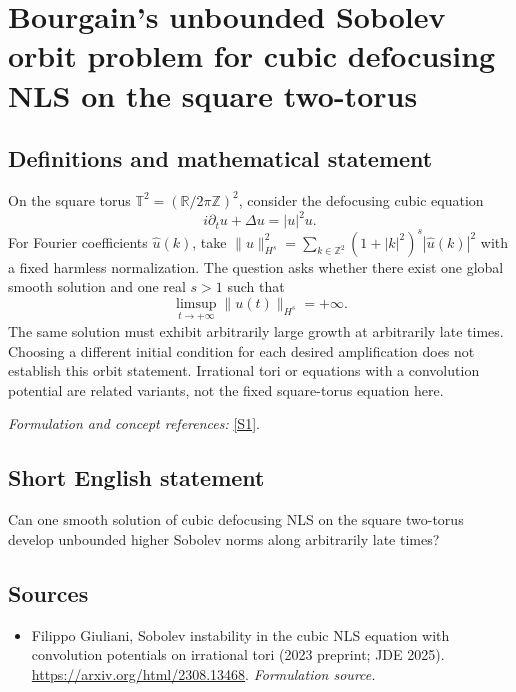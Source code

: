 \documentclass[11pt]{article}
\begin{document}
\section*{\texorpdfstring{Bourgain's unbounded Sobolev orbit problem for cubic defocusing NLS on the square two-torus}{Bourgain's unbounded Sobolev orbit problem for cubic defocusing NLS on the square two-torus}}\label{387}
\subsection{Definitions and mathematical statement}
On the square torus $\mathbb T^2=({\mathbb{R}}/2\pi{\mathbb{Z}})^2$, consider the defocusing cubic equation
\[
 i\partial_tu+\Delta u=|u|^2u.
\]
For Fourier coefficients $\widehat u(k)$, take $\|u\|_{H^s}^2=\sum_{k\in{\mathbb{Z}}^2}(1+|k|^2)^s|\widehat u(k)|^2$ with a fixed harmless normalization. The question asks whether there exist one global smooth solution and one real $s>1$ such that
\[
 \limsup_{t\to+\infty}\|u(t)\|_{H^s}=+\infty.
\]
The same solution must exhibit arbitrarily large growth at arbitrarily late times. Choosing a different initial condition for each desired amplification does not establish this orbit statement. Irrational tori or equations with a convolution potential are related variants, not the fixed square-torus equation here.
\par\smallskip\textit{Formulation and concept references:} \href{https://arxiv.org/html/2308.13468}{[S1]}.

\subsection{Short English statement}
Can one smooth solution of cubic defocusing NLS on the square two-torus develop unbounded higher Sobolev norms along arbitrarily late times?
\subsection{Sources}
\begin{itemize}
\item[S1]Filippo Giuliani, Sobolev instability in the cubic NLS equation with convolution potentials on irrational tori (2023 preprint; JDE 2025).
\url{https://arxiv.org/html/2308.13468}.
\textit{Formulation source.}
\end{itemize}
\end{document}
